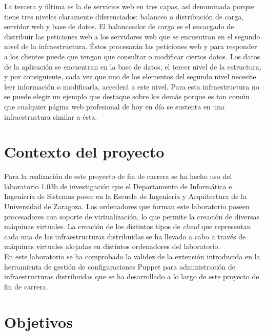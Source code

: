 La tercera y última es la de servicios web en tres capas, así denominada porque tiene tres niveles claramente diferenciados: balanceo o distribución de carga, servidor web y base de datos. El balanceador de carga es el encargado de distribuir las peticiones web a los servidores web que se encuentran en el segundo nivel de la infraestructura. Éstos procesarán las peticiones web y para responder a los clientes puede que tengan que consultar o modificar ciertos datos. Los datos de la aplicación se encuentran en la base de datos, el tercer nivel de la estructura, y por consiguiente, cada vez que uno de los elementos del segundo nivel necesite leer información o modificarla, accederá a este nivel. Para esta infraestructura no se puede elegir un ejemplo que destaque sobre los demás porque es tan común que cualquier página web profesional de hoy en día se sustenta en una infraestructura similar a ésta.\\


\section{Contexto del proyecto}

Para la realización de este proyecto de fin de carrera se ha hecho uso del laboratorio 1.03b de investigación que el Departamento de Informática e Ingeniería de Sistemas posee en la Escuela de Ingeniería y Arquitectura de la Universidad de Zaragoza. Los ordenadores que forman este laboratorio poseen procesadores con soporte de virtualización, lo que permite la creación de diversas máquinas virtuales. La creación de los distintos tipos de \emph{cloud} que representan cada una de las infraestructuras distribuidas se ha llevado a cabo a través de máquinas virtuales alojadas en distintos ordenadores del laboratorio.\\

En este laboratorio se ha comprobado la validez de la extensión introducida en la herramienta de gestión de configuraciones Puppet para administración de infraestructuras distribuidas que se ha desarrollado a lo largo de este proyecto de fin de carrera.


\section{Objetivos}

